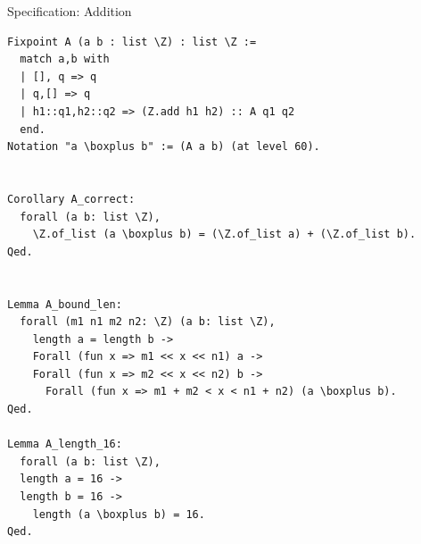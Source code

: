 \documentclass[8pt]{beamer}
\begin{document}
%
%

\begin{frame}[fragile]{Specification: Addition}
  \begin{center}
\begin{lstlisting}[language=Coq]
Fixpoint A (a b : list \Z) : list \Z :=
  match a,b with
  | [], q => q
  | q,[] => q
  | h1::q1,h2::q2 => (Z.add h1 h2) :: A q1 q2
  end.
Notation "a \boxplus b" := (A a b) (at level 60).


Corollary A_correct:
  forall (a b: list \Z),
    \Z.of_list (a \boxplus b) = (\Z.of_list a) + (\Z.of_list b).
Qed.


Lemma A_bound_len:
  forall (m1 n1 m2 n2: \Z) (a b: list \Z),
    length a = length b ->
    Forall (fun x => m1 << x << n1) a ->
    Forall (fun x => m2 << x << n2) b ->
      Forall (fun x => m1 + m2 < x < n1 + n2) (a \boxplus b).
Qed.

Lemma A_length_16:
  forall (a b: list \Z),
  length a = 16 ->
  length b = 16 ->
    length (a \boxplus b) = 16.
Qed.
\end{lstlisting}

  \end{center}
\end{frame}
\end{document}
